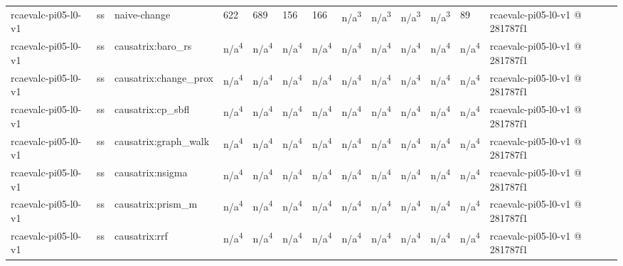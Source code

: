 \begin{table}[t]
\begin{tabular}{lllllllllllll}
rcaevalc-pi05-l0-v1 & ss & naive-change & 622 & 689 & 156 & 166 & n/a\textsuperscript{3} & n/a\textsuperscript{3} & n/a\textsuperscript{3} & n/a\textsuperscript{3} & 89 & rcaevalc-pi05-l0-v1 @ 281787f1 \\
rcaevalc-pi05-l0-v1 & ss & causatrix:baro\_rs & n/a\textsuperscript{4} & n/a\textsuperscript{4} & n/a\textsuperscript{4} & n/a\textsuperscript{4} & n/a\textsuperscript{4} & n/a\textsuperscript{4} & n/a\textsuperscript{4} & n/a\textsuperscript{4} & n/a\textsuperscript{4} & rcaevalc-pi05-l0-v1 @ 281787f1 \\
rcaevalc-pi05-l0-v1 & ss & causatrix:change\_prox & n/a\textsuperscript{4} & n/a\textsuperscript{4} & n/a\textsuperscript{4} & n/a\textsuperscript{4} & n/a\textsuperscript{4} & n/a\textsuperscript{4} & n/a\textsuperscript{4} & n/a\textsuperscript{4} & n/a\textsuperscript{4} & rcaevalc-pi05-l0-v1 @ 281787f1 \\
rcaevalc-pi05-l0-v1 & ss & causatrix:cp\_sbfl & n/a\textsuperscript{4} & n/a\textsuperscript{4} & n/a\textsuperscript{4} & n/a\textsuperscript{4} & n/a\textsuperscript{4} & n/a\textsuperscript{4} & n/a\textsuperscript{4} & n/a\textsuperscript{4} & n/a\textsuperscript{4} & rcaevalc-pi05-l0-v1 @ 281787f1 \\
rcaevalc-pi05-l0-v1 & ss & causatrix:graph\_walk & n/a\textsuperscript{4} & n/a\textsuperscript{4} & n/a\textsuperscript{4} & n/a\textsuperscript{4} & n/a\textsuperscript{4} & n/a\textsuperscript{4} & n/a\textsuperscript{4} & n/a\textsuperscript{4} & n/a\textsuperscript{4} & rcaevalc-pi05-l0-v1 @ 281787f1 \\
rcaevalc-pi05-l0-v1 & ss & causatrix:nsigma & n/a\textsuperscript{4} & n/a\textsuperscript{4} & n/a\textsuperscript{4} & n/a\textsuperscript{4} & n/a\textsuperscript{4} & n/a\textsuperscript{4} & n/a\textsuperscript{4} & n/a\textsuperscript{4} & n/a\textsuperscript{4} & rcaevalc-pi05-l0-v1 @ 281787f1 \\
rcaevalc-pi05-l0-v1 & ss & causatrix:prism\_m & n/a\textsuperscript{4} & n/a\textsuperscript{4} & n/a\textsuperscript{4} & n/a\textsuperscript{4} & n/a\textsuperscript{4} & n/a\textsuperscript{4} & n/a\textsuperscript{4} & n/a\textsuperscript{4} & n/a\textsuperscript{4} & rcaevalc-pi05-l0-v1 @ 281787f1 \\
rcaevalc-pi05-l0-v1 & ss & causatrix:rrf & n/a\textsuperscript{4} & n/a\textsuperscript{4} & n/a\textsuperscript{4} & n/a\textsuperscript{4} & n/a\textsuperscript{4} & n/a\textsuperscript{4} & n/a\textsuperscript{4} & n/a\textsuperscript{4} & n/a\textsuperscript{4} & rcaevalc-pi05-l0-v1 @ 281787f1 \\

\end{tabular}
\end{table}
